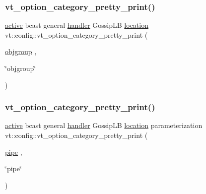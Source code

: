 \mbox{\label{namespacevt_1_1config_aa54891213a371057c897d43f797812b9}} 
\subsubsection{\texorpdfstring{vt\+\_\+option\+\_\+category\+\_\+pretty\+\_\+print()}{vt\_option\_category\_pretty\_print()}\hspace{0.1cm}{\footnotesize\ttfamily [7/16]}}
{\footnotesize\ttfamily \hyperlink{namespacevt_1_1config_a6bd1d6215bda0d8ca02811798399f689a82f77c67af0c363709010c6df4dbd920}{active} bcast general \hyperlink{namespacevt_1_1config_a6bd1d6215bda0d8ca02811798399f689a82a0081a94d5c5dfd18b0b3f7eca64b7}{handler} Gossip\+LB \hyperlink{namespacevt_1_1config_a6bd1d6215bda0d8ca02811798399f689aa8d8501591ca3859c828489054b17640}{location} vt\+::config\+::vt\+\_\+option\+\_\+category\+\_\+pretty\+\_\+print (\begin{DoxyParamCaption}\item[{\hyperlink{namespacevt_1_1config_a6bd1d6215bda0d8ca02811798399f689a338198b4d813c2e8d709e0015fc40d45}{objgroup}}]{,  }\item[{\char`\"{}objgroup\char`\"{}}]{ }\end{DoxyParamCaption})}

\mbox{\label{namespacevt_1_1config_a44edce231ecafe7f2d5f2de6cc00667c}} 
\subsubsection{\texorpdfstring{vt\+\_\+option\+\_\+category\+\_\+pretty\+\_\+print()}{vt\_option\_category\_pretty\_print()}\hspace{0.1cm}{\footnotesize\ttfamily [8/16]}}
{\footnotesize\ttfamily \hyperlink{namespacevt_1_1config_a6bd1d6215bda0d8ca02811798399f689a82f77c67af0c363709010c6df4dbd920}{active} bcast general \hyperlink{namespacevt_1_1config_a6bd1d6215bda0d8ca02811798399f689a82a0081a94d5c5dfd18b0b3f7eca64b7}{handler} Gossip\+LB \hyperlink{namespacevt_1_1config_a6bd1d6215bda0d8ca02811798399f689aa8d8501591ca3859c828489054b17640}{location} parameterization vt\+::config\+::vt\+\_\+option\+\_\+category\+\_\+pretty\+\_\+print (\begin{DoxyParamCaption}\item[{\hyperlink{namespacevt_1_1config_a6bd1d6215bda0d8ca02811798399f689ad2f6c4149417910966357969e4740fbd}{pipe}}]{,  }\item[{\char`\"{}pipe\char`\"{}}]{ }\end{DoxyParamCaption})}

